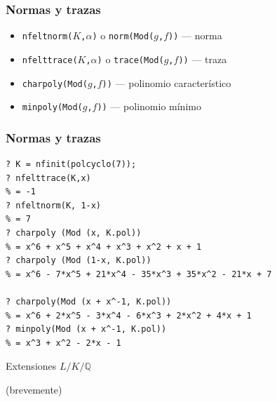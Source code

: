 \documentclass{beamer}
\newcommand{\QQ}{\mathbb{Q}}
\begin{document}

\begin{frame}[fragile]
  \frametitle{Normas y trazas}

  \begin{itemize}
  \item \texttt{nfeltnorm($K$,$\alpha$)} o \texttt{norm(Mod($g$,$f$))} --- norma
  \item \texttt{nfelttrace($K$,$\alpha$)} o \texttt{trace(Mod($g$,$f$))} --- traza
  \item \texttt{charpoly(Mod($g$,$f$))} --- polinomio característico
  \item \texttt{minpoly(Mod($g$,$f$))} --- polinomio mínimo
  \end{itemize}
\end{frame}


\begin{frame}[fragile]
  \frametitle{Normas y trazas}

  \begin{shaded}\small
\begin{verbatim}
? K = nfinit(polcyclo(7));
? nfelttrace(K,x)
% = -1
? nfeltnorm(K, 1-x)
% = 7
? charpoly (Mod (x, K.pol))
% = x^6 + x^5 + x^4 + x^3 + x^2 + x + 1
? charpoly (Mod (1-x, K.pol))
% = x^6 - 7*x^5 + 21*x^4 - 35*x^3 + 35*x^2 - 21*x + 7

? charpoly(Mod (x + x^-1, K.pol))
% = x^6 + 2*x^5 - 3*x^4 - 6*x^3 + 2*x^2 + 4*x + 1
? minpoly(Mod (x + x^-1, K.pol))
% = x^3 + x^2 - 2*x - 1
\end{verbatim}
  \end{shaded}
\end{frame}


\begin{frame}[plain]
  \headingfont
  \begin{center}
    {\huge Extensiones $L/K/\QQ$

      (brevemente)

    }
  \end{center}
\end{frame}

\end{document}
